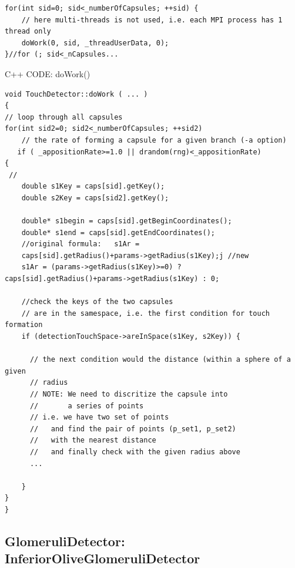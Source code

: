 \begin{verbatim}
for(int sid=0; sid<_numberOfCapsules; ++sid) {
    // here multi-threads is not used, i.e. each MPI process has 1 thread only
    doWork(0, sid, _threadUserData, 0);
}//for (; sid<_nCapsules...
\end{verbatim}


C++ CODE: doWork()
{\small
\begin{lstlisting}
void TouchDetector::doWork ( ... ) 
{
// loop through all capsules
for(int sid2=0; sid2<_numberOfCapsules; ++sid2)
    // the rate of forming a capsule for a given branch (-a option)
   if ( _appositionRate>=1.0 || drandom(rng)<_appositionRate) 
{
 //
    double s1Key = caps[sid].getKey();
    double s2Key = caps[sid2].getKey();
    
    double* s1begin = caps[sid].getBeginCoordinates();
    double* s1end = caps[sid].getEndCoordinates();
    //original formula:   s1Ar =
    caps[sid].getRadius()+params->getRadius(s1Key);j //new
    s1Ar = (params->getRadius(s1Key)>=0) ? caps[sid].getRadius()+params->getRadius(s1Key) : 0;
   
    //check the keys of the two capsules
    // are in the samespace, i.e. the first condition for touch formation
    if (detectionTouchSpace->areInSpace(s1Key, s2Key)) {

      // the next condition would the distance (within a sphere of a given
      // radius
      // NOTE: We need to discritize the capsule into
      //       a series of points
      // i.e. we have two set of points
      //   and find the pair of points (p_set1, p_set2) 
      //   with the nearest distance 
      //   and finally check with the given radius above
      ...
      
    }
}
}
\end{lstlisting}
}



\subsection{GlomeruliDetector: InferiorOliveGlomeruliDetector}
\label{sec:GlomeruliDetector}
\label{sec:InferiorOliveGlomeruliDetector}




